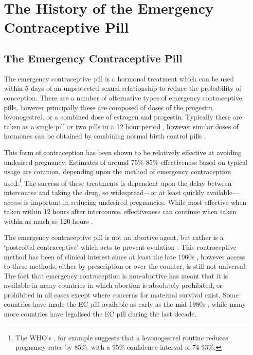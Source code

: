 \section{The History of the Emergency Contraceptive Pill}
\label{TEENscn:background}
\subsection{The Emergency Contraceptive Pill}
The emergency contraceptive pill is a hormonal treatment which can be used 
within 5 days of an unprotected sexual relationship to reduce the probability
of conception.  There are a number of alternative types of emergency 
contraceptive pills, however principally these are composed of doses of the 
progestin levonogestrel, or a combined dose of estrogen and progestin. 
Typically these are taken as a single pill or two pills in a 12 hour period
\citep{vonHertzenetal2002}, however similar doses of hormones can be obtained 
by combining normal birth control pills \citep{Ellersonetal1998}.  

This form of contraception has been shown to be relatively effective at 
avoiding undesired pregnancy.  Estimates of around 75\%-85\% effectiveness 
based on typical usage are common, depending upon the method of emergency 
contraception used.\footnote{The WHO's \citet{WHO1998}, for example suggests 
that a levonogestrel routine reduces pregnancy rates by 85\%, with a 95\% 
confidence interval of 74-93\%.}  The success of these treatments is dependent
upon the delay between intercourse and taking the drug, so widespread---or at 
least quickly available---access is important in reducing undesired pregnancies.
While most effective when taken within 12 hours after intercourse, 
effectiveness can continue when taken within as much as 120 hours
\citep{vonHertzenetal2002}.

The emergency contraceptive pill is not an abortive agent, but rather is a 
`postcoital contraceptive' which acts to prevent ovulation 
\citep{Novikovaetal2007, Noeetal2011}. This contraceptive method has been of 
clinical interest since at least the late 1960s \citep{Demers1971}, however 
access to these methods, either by prescription or over the counter, is still 
not universal.  The fact that emergency contraception is non-abortive has 
meant that it is available in many countries in which abortion is absolutely 
prohibited, or prohibited in all cases except where concerns for maternal 
survival exist.  Some countries have made the EC pill available as early as 
the mid-1980s \citep{UKFPA2006}, while many more countries have legalised 
the EC pill during the last decade.

